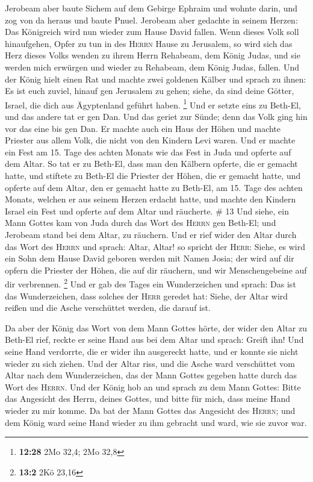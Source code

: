  Jerobeam aber baute Sichem auf dem Gebirge Ephraim und
wohnte darin, und zog von da heraus und baute Pnuel. 
Jerobeam aber gedachte in seinem Herzen: Das Königreich wird nun wieder
zum Hause David fallen.  Wenn dieses Volk soll
hinaufgehen, Opfer zu tun in des \textsc{Herrn} Hause zu Jerusalem, so
wird sich das Herz dieses Volks wenden zu ihrem Herrn Rehabeam, dem
König Judas, und sie werden mich erwürgen und wieder zu Rehabeam, dem
König Judas, fallen.  Und der König hielt einen Rat und
machte zwei goldenen Kälber und sprach zu ihnen: Es ist euch zuviel,
hinauf gen Jerusalem zu gehen; siehe, da sind deine Götter, Israel, die
dich aus Ägyptenland geführt haben. \footnote{\textbf{12:28} 2Mo 32,4;
  2Mo 32,8}  Und er setzte eins zu Beth-El, und das
andere tat er gen Dan.  Und das geriet zur Sünde; denn
das Volk ging hin vor das eine bis gen Dan.  Er machte
auch ein Haus der Höhen und machte Priester aus allem Volk, die nicht
von den Kindern Levi waren.  Und er machte ein Fest am
15. Tage des achten Monats wie das Fest in Juda und opferte auf dem
Altar. So tat er zu Beth-El, dass man den Kälbern opferte, die er
gemacht hatte, und stiftete zu Beth-El die Priester der Höhen, die er
gemacht hatte,  und opferte auf dem Altar, den er gemacht
hatte zu Beth-El, am 15. Tage des achten Monats, welchen er aus seinem
Herzen erdacht hatte, und machte den Kindern Israel ein Fest und opferte
auf dem Altar und räucherte. \# 13  Und siehe, ein Mann
Gottes kam von Juda durch das Wort des \textsc{Herrn} gen Beth-El; und
Jerobeam stand bei dem Altar, zu räuchern.  Und er rief
wider den Altar durch das Wort des \textsc{Herrn} und sprach: Altar,
Altar! so spricht der \textsc{Herr}: Siehe, es wird ein Sohn dem Hause
David geboren werden mit Namen Josia; der wird auf dir opfern die
Priester der Höhen, die auf dir räuchern, und wir Menschengebeine auf
dir verbrennen. \footnote{\textbf{13:2} 2Kö 23,16}  Und er
gab des Tages ein Wunderzeichen und sprach: Das ist das Wunderzeichen,
dass solches der \textsc{Herr} geredet hat: Siehe, der Altar wird reißen
und die Asche verschüttet werden, die darauf ist.

 Da aber der König das Wort von dem Mann Gottes hörte, der
wider den Altar zu Beth-El rief, reckte er seine Hand aus bei dem Altar
und sprach: Greift ihn! Und seine Hand verdorrte, die er wider ihn
ausgereckt hatte, und er konnte sie nicht wieder zu sich ziehen.
 Und der Altar riss, und die Asche ward verschüttet vom
Altar nach dem Wunderzeichen, das der Mann Gottes gegeben hatte durch
das Wort des \textsc{Herrn}.  Und der König hob an und
sprach zu dem Mann Gottes: Bitte das Angesicht des Herrn, deines Gottes,
und bitte für mich, dass meine Hand wieder zu mir komme. Da bat der Mann
Gottes das Angesicht des \textsc{Herrn}; und dem König ward seine Hand
wieder zu ihm gebracht und ward, wie sie zuvor war.

